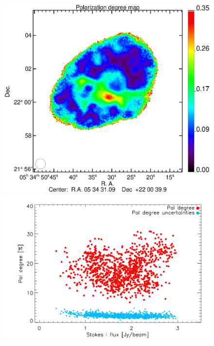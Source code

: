 \documentclass[twocolumn,traditabstract]{aa}
\begin{document}
 \begin{figure}
\centering
\includegraphics[clip, angle=0, scale = 0.35]{figures/Crab_pol_deg2_2mm.eps}
\includegraphics[clip, angle=0, scale = 0.5]{figures/pol_deg_vs_I_2mm.pdf}

\end{figure}
\end{document}
